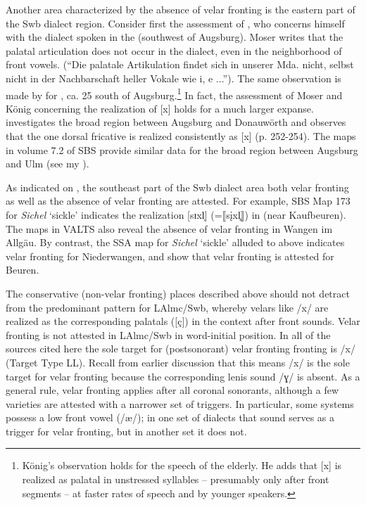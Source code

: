 Another area characterized by the absence of velar fronting is the eastern part of the Swb dialect region. Consider first the assessment of \citet[8]{Moser1936}, who concerns himself with the dialect spoken in the  (southwest of Augsburg). Moser writes that the palatal articulation does not occur in the dialect, even in the neighborhood of front vowels. (“Die palatale Artikulation findet sich in unserer Mda. nicht, selbst nicht in der Nachbarschaft heller Vokale wie i, e ...”). The same observation is made by \citet[46]{König1970} for , ca. 25 south of Augsburg.\footnote{{König’s observation holds for the speech of the elderly. He adds that [x] is realized as palatal in unstressed syllables -- presumably only after front segments -- at faster rates of speech and by younger speakers.}} In fact, the assessment of Moser and König concerning the realization of [x] holds for a much larger expanse. \citet{Ibrom1971} investigates the broad region between Augsburg and Donauwörth and observes that the one dorsal fricative is realized consistently as [x] (p. 252-254). The maps in volume 7.2 of SBS provide similar data for the broad region between Augsburg and Ulm (see my ).

As indicated on , the southeast part of the Swb dialect area both velar fronting as well as the absence of velar fronting are attested. For example, SBS Map 173 for \textit{Sichel} ‘sickle’ indicates the realization [sɪxl̩] (=⟦s\k{i}xl̥⟧) in  (near Kaufbeuren). The maps in VALTS also reveal the absence of velar fronting in Wangen im Allgäu. By contrast, the SSA map for \textit{Sichel}  ‘sickle’ alluded to above indicates velar fronting for Niederwangen, and \citet{BausingerRuoff1959} show that velar fronting is attested for Beuren.

The conservative (non-velar fronting) places described above should not detract from the predominant pattern for LAlmc/Swb, whereby velars like /x/ are realized as the corresponding palatals ([ç]) in the context after front sounds. Velar fronting is not attested in LAlmc/Swb in word-initial position. In all of the sources cited here the sole target for (postsonorant) velar fronting fronting is /x/ (Target Type LL). Recall from earlier discussion that this means /x/ is the sole target for velar fronting because the corresponding lenis sound /ɣ/ is absent. As a general rule, velar fronting applies after all coronal sonorants, although a few varieties are attested with a narrower set of triggers. In particular, some systems possess a low front vowel (/æ/); in one set of dialects that sound serves as a trigger for velar fronting, but in another set it does not.

